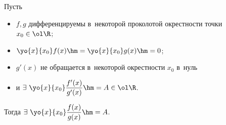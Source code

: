 
    Пусть 
    \begin{itemize}
      \item $f,g$ дифференцируемы в~некоторой проколотой окрестности точки $x_0\in\ol\R$;
      \item $\yo{x}{x_0}f(x)\hm=\yo{x}{x_0}g(x)\hm=0$;
      \item $g'(x)$ не обращается в~некоторой окрестности $x_0$ в~нуль
      \item и $\exists\ \yo{x}{x_0}\dfrac{f'(x)}{g'(x)}\hm=A\in\ol\R$.
    \end{itemize}
     Тогда $\exists\ \yo{x}{x_0}\dfrac{f(x)}{g(x)}\hm=A$.
